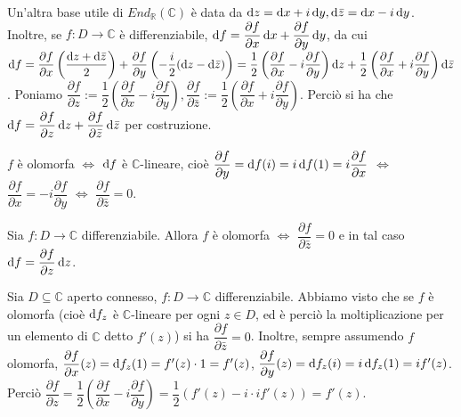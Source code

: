 Un'altra base utile di $End_{\mathbb{R}}(\mathbb{C})$ è data da $\mathop{}\!\mathrm{d} z= \mathop{}\!\mathrm{d} x+i\mathop{}\!\mathrm{d} y, \mathop{}\!\mathrm{d} \bar{z}=\mathop{}\!\mathrm{d} x-i\mathop{}\!\mathrm{d} y$. Inoltre, se $f:D \longrightarrow \mathbb{C}$ è differenziabile, $\mathop{}\!\mathrm{d} f=\dfrac{\partial f}{\partial x}\mathop{}\!\mathrm{d} x+\dfrac{\partial f}{\partial y}\mathop{}\!\mathrm{d} y$,
da cui $\mathop{}\!\mathrm{d} f=\dfrac{\partial f}{\partial x}\left(\dfrac{\mathop{}\!\mathrm{d} z+\mathop{}\!\mathrm{d} \bar{z}}{2}\right)+\dfrac{\partial f}{\partial y}\left(-\dfrac{i}{2}(\mathop{}\!\mathrm{d} z-\mathop{}\!\mathrm{d} \bar{z})\right)=\dfrac{1}{2}\left(\dfrac{\partial f}{\partial x}-i\dfrac{\partial f}{\partial y}\right)\mathop{}\!\mathrm{d} z+\dfrac{1}{2}\left(\dfrac{\partial f}{\partial x}+i\dfrac{\partial f}{\partial y}\right)\mathop{}\!\mathrm{d} \bar{z}$.
Poniamo $\dfrac{\partial f}{\partial z}:=\dfrac{1}{2}\left(\dfrac{\partial f}{\partial x}-i\dfrac{\partial f}{\partial y}\right), \dfrac{\partial f}{\partial \bar{z}}:=\dfrac{1}{2}\left(\dfrac{\partial f}{\partial x}+i\dfrac{\partial f}{\partial y}\right)$.
Perciò si ha che $\mathop{}\!\mathrm{d} f=\dfrac{\partial f}{\partial z}\mathop{}\!\mathrm{d} z+\dfrac{\partial f}{\partial \bar{z}}\mathop{}\!\mathrm{d} \bar{z}$ per costruzione.

\begin{oss}
  $f$ è olomorfa $\iff$ $\mathop{}\!\mathrm{d} f$ è $\mathbb{C}$-lineare, cioè $\dfrac{\partial f}{\partial y}=\mathop{}\!\mathrm{d} f(i)=i\mathop{}\!\mathrm{d} f(1)=i\dfrac{\partial f}{\partial x}$ $\iff$ $\dfrac{\partial f}{\partial x}=-i\dfrac{\partial f}{\partial y}$ $\iff$ $\dfrac{\partial f}{\partial \bar{z}}=0$.
\end{oss}

\begin{prop}
  Sia $f:D \longrightarrow \mathbb{C}$ differenziabile. Allora $f$ è olomorfa $\iff$ $\dfrac{\partial f}{\partial \bar{z}}=0$ e in tal caso $\mathop{}\!\mathrm{d} f=\dfrac{\partial f}{\partial z}\mathop{}\!\mathrm{d} z$.
\end{prop}

\begin{oss}
  Sia $D \subseteq \mathbb{C}$ aperto connesso, $f:D \longrightarrow \mathbb{C}$ differenziabile. Abbiamo visto che se $f$ è olomorfa (cioè $\mathop{}\!\mathrm{d} f_z$ è $\mathbb{C}$-lineare per ogni $z \in D$, ed è perciò la moltiplicazione per un elemento di $\mathbb{C}$ detto $f'(z)$) si ha $\dfrac{\partial f}{\partial \bar{z}}=0$.
  Inoltre, sempre assumendo $f$ olomorfa, $\dfrac{\partial f}{\partial x}(z)=\mathop{}\!\mathrm{d} f_z(1)=f'(z)\cdot 1=f'(z)$, $\dfrac{\partial f}{\partial y}(z)=\mathop{}\!\mathrm{d} f_z(i)=i\mathop{}\!\mathrm{d} f_z(1)=if'(z)$.
  Perciò $\dfrac{\partial f}{\partial z}=\dfrac{1}{2}\left(\dfrac{\partial f}{\partial x}-i\dfrac{\partial f}{\partial y}\right)=\dfrac{1}{2}(f'(z)-i \cdot if'(z))=f'(z)$.
\end{oss}

